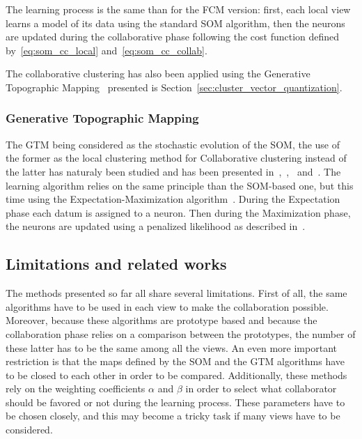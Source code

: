     The learning process is the same than for the FCM version: first, each local view learns a model of its data using the standard SOM algorithm, then the neurons are updated during the collaborative phase following the cost function defined by~\ref{eq:som_cc_local} and~\ref{eq:som_cc_collab}.

    The collaborative clustering has also been applied using the Generative Topographic Mapping~\cite{bishop1998gtm} presented is Section~\ref{sec:cluster_vector_quantization}.

    \subsubsection{Generative Topographic Mapping}

    The GTM being considered as the stochastic evolution of the SOM, the use of the former as the local clustering method for Collaborative clustering instead of the latter has naturaly been studied and has been presented in~\cite{ghassany2012collaborative},~\cite{sublime2015vertical},~\cite{sublime2015horizontal} and~\cite{sublime2016collaborative}. The learning algorithm relies on the same principle than the SOM-based one, but this time using the Expectation-Maximization algorithm~\cite{dempster1977maximum}. During the Expectation phase each datum is assigned to a neuron. Then during the Maximization phase, the neurons are updated using a penalized likelihood as described in~\cite{green1990use}.\\

    \subsection{Limitations and related works}

    The methods presented so far all share several limitations. First of all, the same algorithms have to be used in each view to make the collaboration possible. Moreover, because these algorithms are prototype based and because the collaboration phase relies on a comparison between the prototypes, the number of these latter has to be the same among all the views. An even more important restriction is that the maps defined by the SOM and the GTM algorithms have to be closed to each other in order to be compared. Additionally, these methods rely on the weighting coefficients $\alpha$ and $\beta$ in order to select what collaborator should be favored or not during the learning process. These parameters have to be chosen closely, and this may become a tricky task if many views have to be considered.

